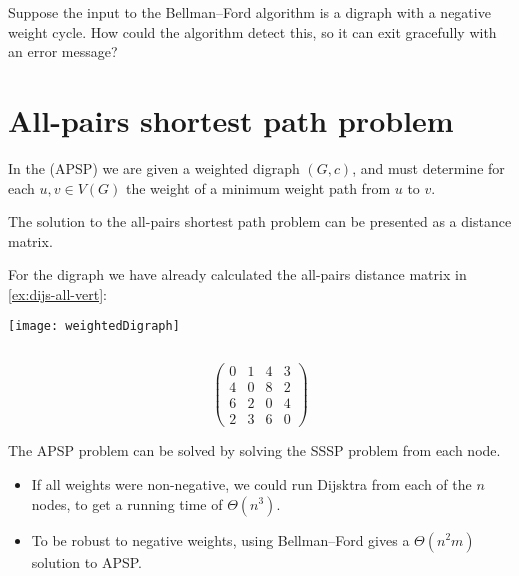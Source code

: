 \begin{Boxample}[2]\label{ex:bellman-neg-cycle}
Suppose the input to the Bellman--Ford algorithm is a digraph with a
negative weight cycle. How could the algorithm detect this, so it can
exit gracefully with an error message?
\end{Boxample}




\chapter{All-pairs shortest path problem} %
\label{sec:APSP}

\begin{Definition}
In the  (APSP) we are given a weighted digraph $(G, c)$, 
and must determine for each $u, v\in V(G)$ the weight of a minimum weight path from $u$ to $v$.
\end{Definition}
The solution to the all-pairs shortest path problem can be presented as a distance matrix.

\begin{Boxample}[0] \label{eg:APSP}
For the digraph we have already
calculated the all-pairs distance matrix in \cref{ex:dijs-all-vert}:\\

  \begin{minipage}[c]{0.45\textwidth}
  \begin{center}
	\texttt{[image: weightedDigraph]}
  \end{center}
  \end{minipage}$\quad$
  \begin{minipage}[c]{0.45\textwidth}
	$$ \left(
	\begin{matrix}
	0 & 1 & 4 & 3 \\
	4 & 0 & 8 & 2 \\
	6 & 2 & 0 & 4 \\
	2 & 3 & 6 & 0
	\end{matrix}
	\right)$$
  \end{minipage}
\end{Boxample}

The APSP problem can be solved by solving the SSSP problem from each node.
\begin{itemize}
  \item If all weights were non-negative, we could run Dijsktra from each of the $n$ nodes, to get a running time of $\Theta(n^3)$.
  \item To be robust to negative weights, using Bellman--Ford gives a $\Theta(n^2 m)$ solution to APSP.
\end{itemize}

